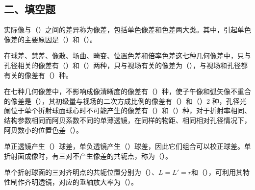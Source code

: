 \documentclass[standard, analysis, notocnum]{ExBook}
\newcommand{\answerarea}[1][8cm]{%
  \par\vspace{2mm}%
  \noindent{\color{themeColor!35}\rule{\linewidth}{0.4pt}}\par
  \noindent\begin{minipage}[t][#1][t]{\linewidth}\vspace{0pt}\end{minipage}\par
  \noindent{\color{themeColor!35}\rule{\linewidth}{0.4pt}}\par
}
\begin{document}
\subsection{二、填空题}
\begin{qitems}
\begin{bbox}
\qitem 实际像与（\hspace{1.6em}）之间的差异称为像差，包括单色像差和色差两大类。其中，引起单色像差的主要原因是（\hspace{1.6em}）和（\hspace{1.6em}）。
\answerarea[3.5cm]
\end{bbox}
\begin{bbox}
\qitem 在球差、慧差、像散、场曲、畸变、位置色差和倍率色差这七种几何像差中，只与孔径相关的像差有（\hspace{1.6em}）和（\hspace{1.6em}）两种，只与视场有关的像差为（\hspace{1.6em}），与视场和孔径都有关的像差有（\hspace{1.6em}）种。
\answerarea[3.5cm]
\end{bbox}
\begin{bbox}
\qitem 在七种几何像差中，不影响成像清晰度的像差有（\hspace{1.6em}）种，使子午像和弧矢像不重合的像差是（\hspace{1.6em}），其初级量与视场的二次方成比例的像差有（\hspace{1.6em}）和（\hspace{1.6em}）2 种，孔径光阑位于单个折射球面球心时不可能产生的像差有（\hspace{1.6em}）和（\hspace{1.6em}）种，对于折射率相同、结构参数相同而阿贝系数不同的单薄透镜，在同样的物距、相同相对孔径情况下，阿贝数小的位置色差（\hspace{1.6em}）。
\answerarea[3.5cm]
\end{bbox}
\begin{bbox}
\qitem 单正透镜产生（\hspace{1.6em}）球差，单负透镜产生（\hspace{1.6em}）球差，因此它们组合可以校正球差。单折射面成像时，有三对不产生像差的共轭点，称为（\hspace{1.6em}）。
\answerarea[3.5cm]
\end{bbox}
\begin{bbox}
\qitem 单个折射球面的三对齐明点的共轭位置分别为（\hspace{1.6em}）、$L=L'=r$和（\hspace{1.6em}），可利用其特性制作齐明透镜，对应的垂轴放大率为（\hspace{1.6em}）。

\end{bbox}
\end{qitems}
\end{document}
